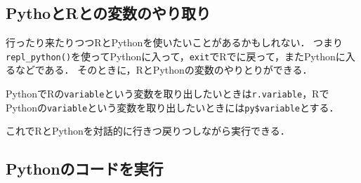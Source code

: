 \documentclass[
]{article}
\newenvironment{Shaded}{\begin{snugshade}}{\end{snugshade}}
\newcommand{\AttributeTok}[1]{\textcolor[rgb]{0.77,0.63,0.00}{#1}}
\newcommand{\CommentTok}[1]{\textcolor[rgb]{0.56,0.35,0.01}{\textit{#1}}}
\newcommand{\ConstantTok}[1]{\textcolor[rgb]{0.00,0.00,0.00}{#1}}
\newcommand{\DocumentationTok}[1]{\textcolor[rgb]{0.56,0.35,0.01}{\textbf{\textit{#1}}}}
\newcommand{\ErrorTok}[1]{\textcolor[rgb]{0.64,0.00,0.00}{\textbf{#1}}}
\newcommand{\FunctionTok}[1]{\textcolor[rgb]{0.00,0.00,0.00}{#1}}
\newcommand{\NormalTok}[1]{#1}
\newcommand{\OtherTok}[1]{\textcolor[rgb]{0.56,0.35,0.01}{#1}}
\newcommand{\SpecialCharTok}[1]{\textcolor[rgb]{0.00,0.00,0.00}{#1}}
\newcommand{\StringTok}[1]{\textcolor[rgb]{0.31,0.60,0.02}{#1}}
\begin{document}
\hypertarget{pythoux3068rux3068ux306eux5909ux6570ux306eux3084ux308aux53d6ux308a}{%
\subsection{PythoとRとの変数のやり取り}\label{pythoux3068rux3068ux306eux5909ux6570ux306eux3084ux308aux53d6ux308a}}

行ったり来たりつつRとPythonを使いたいことがあるかもしれない．
つまり\texttt{repl\_python()}を使ってPythonに入って，\texttt{exit}でRでに戻って，またPythonに入るなどである．
そのときに，RとPythonの変数のやりとりができる．

PythonでRの\texttt{variable}という変数を取り出したいときは\texttt{r.variable}，RでPythonの\texttt{variable}という変数を取り出したいときには\texttt{py\$variable}とする．

\begin{Shaded}
\end{Shaded}

これでRとPythonを対話的に行きつ戻りつしながら実行できる．

\begin{Shaded}
\end{Shaded}

\hypertarget{pythonux306eux30b3ux30fcux30c9ux3092ux5b9fux884c}{%
\subsection{Pythonのコードを実行}\label{pythonux306eux30b3ux30fcux30c9ux3092ux5b9fux884c}}
\end{document}
